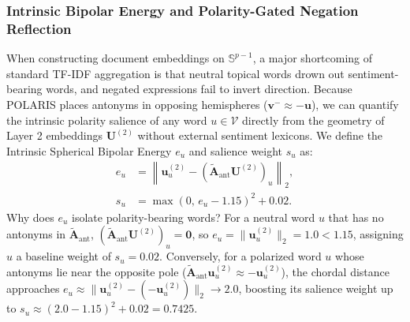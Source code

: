 \documentclass[journal]{IEEEtran}
\begin{document}
\subsubsection{Intrinsic Bipolar Energy and Polarity-Gated Negation Reflection}
When constructing document embeddings on $\mathbb{S}^{p-1}$, a major shortcoming of standard TF-IDF aggregation is that neutral topical words drown out sentiment-bearing words, and negated expressions fail to invert direction. Because POLARIS places antonyms in opposing hemispheres ($\mathbf{v}^- \approx -\mathbf{u}$), we can quantify the intrinsic polarity salience of any word $u \in \mathcal{V}$ directly from the geometry of Layer 2 embeddings $\mathbf{U}^{(2)}$ without external sentiment lexicons. We define the Intrinsic Spherical Bipolar Energy $e_u$ and salience weight $s_u$ as:
\begin{equation}
\begin{aligned}
e_u &= \left\|\mathbf{u}_u^{(2)} - \left(\tilde{\mathbf{A}}_{\text{ant}}\mathbf{U}^{(2)}\right)_u\right\|_2, \\
s_u &= \max\!\left(0, \, e_u - 1.15\right)^2 + 0.02.
\end{aligned}
\label{eq:bipolar_energy}
\end{equation}
Why does $e_u$ isolate polarity-bearing words? For a neutral word $u$ that has no antonyms in $\tilde{\mathbf{A}}_{\text{ant}}$, $(\tilde{\mathbf{A}}_{\text{ant}}\mathbf{U}^{(2)})_u = \mathbf{0}$, so $e_u = \|\mathbf{u}_u^{(2)}\|_2 = 1.0 < 1.15$, assigning $u$ a baseline weight of $s_u = 0.02$. Conversely, for a polarized word $u$ whose antonyms lie near the opposite pole ($\tilde{\mathbf{A}}_{\text{ant}}\mathbf{u}_u^{(2)} \approx -\mathbf{u}_u^{(2)}$), the chordal distance approaches $e_u \approx \|\mathbf{u}_u^{(2)} - (-\mathbf{u}_u^{(2)})\|_2 \to 2.0$, boosting its salience weight up to $s_u \approx (2.0 - 1.15)^2 + 0.02 = 0.7425$.
\end{document}
